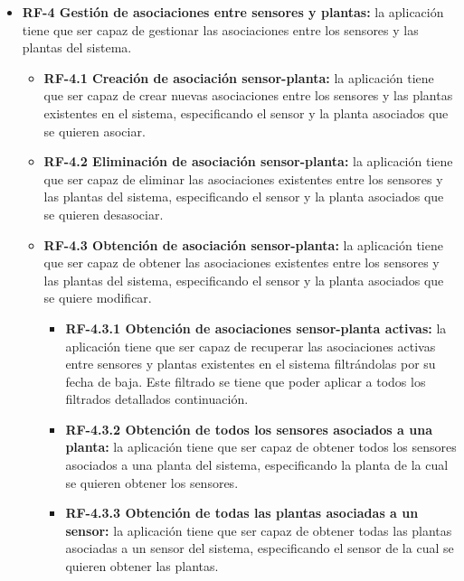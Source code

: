 \begin{itemize}
        \item \textbf{RF-4 Gestión de asociaciones entre sensores y plantas:} la aplicación tiene que ser capaz de gestionar las asociaciones entre los sensores y las plantas del sistema.
            \begin{itemize}
                \item \textbf{RF-4.1 Creación de asociación sensor-planta:} la aplicación tiene que ser capaz de crear nuevas asociaciones entre los sensores y las plantas existentes en el sistema, especificando el sensor y la planta asociados que se quieren asociar.
                \item \textbf{RF-4.2 Eliminación de asociación sensor-planta:} la aplicación tiene que ser capaz de eliminar las asociaciones existentes entre los sensores y las plantas del sistema, especificando el sensor y la planta asociados que se quieren desasociar.
                \item \textbf{RF-4.3 Obtención de asociación sensor-planta:} la aplicación tiene que ser capaz de obtener las asociaciones existentes entre los sensores y las plantas del sistema, especificando el sensor y la planta asociados que se quiere modificar.
                \begin{itemize}
                    \item \textbf{RF-4.3.1 Obtención de asociaciones sensor-planta activas:} la aplicación tiene que ser capaz de recuperar las asociaciones activas entre sensores y plantas existentes en el sistema filtrándolas por su fecha de baja. Este filtrado se tiene que poder aplicar a todos los filtrados detallados continuación. 
                    \item \textbf{RF-4.3.2 Obtención de todos los sensores asociados a una planta:} la aplicación tiene que ser capaz de obtener todos los sensores asociados a una planta del sistema, especificando la planta de la cual se quieren obtener los sensores.
                    \item \textbf{RF-4.3.3 Obtención de todas las plantas asociadas a un sensor:} la aplicación tiene que ser capaz de obtener todas las plantas asociadas a un sensor del sistema, especificando el sensor de la cual se quieren obtener las plantas.
                \end{itemize}
            \end{itemize}
        

\end{itemize}

